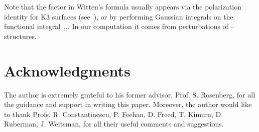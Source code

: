 \documentclass[a4paper,12pt,reqno,sumlimits]{amsart}
\theoremstyle{plain}
\theoremstyle{definition}
\providecommand{\1}{{\bf 1}}
\providecommand{\ex}[1]{{e^{#1}}}
\providecommand{\spinc}{\myHighlight{$\text{spin}^c$}\coordHE{}}
\numberwithin{equation}{section}
\begin{document}
Note that the factor \myHighlight{$\ex{\Sigma^2/2}$}\coordHE{} in Witten's formula usually appears
via the polarization identity for K3 surfaces (see~\cite[p.  690]{km}), or by
performing Gaussian integrals on the functional
integral~\cite{park},\cite{ewdon2},\cite{ewmono}. In our computation it comes
from perturbations of \spinc--structures.



\section*{Acknowledgments}

The author is extremely grateful to his former advisor, Prof. S. Rosenberg,
for all the guidance and support in writing this paper. Moreover, the author
would like to thank Profs. R. Constantinescu, P.  Feehan, D. Freed, T.
Kimura, D. Ruberman, J. Weitsman, for all their useful comments and
suggestions.

\end{document}
